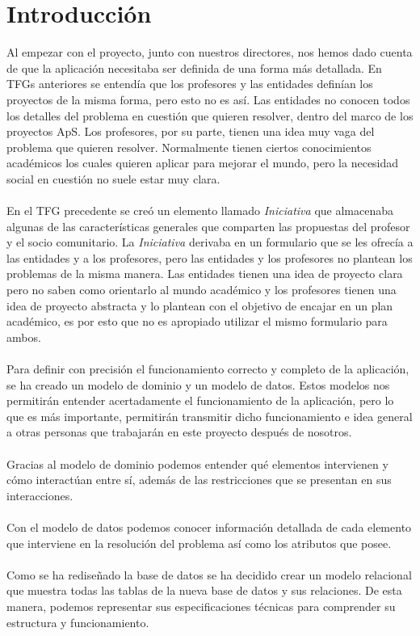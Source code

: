 \documentclass[11pt]{book}
\begin{document}
\section{Introducción}
Al empezar con el proyecto, junto con nuestros directores, nos hemos dado cuenta de que la aplicación necesitaba ser definida de una forma más detallada. En TFGs anteriores se entendía que los profesores y las entidades definían los proyectos de la misma forma, pero esto no es así. Las entidades no conocen todos los detalles del problema en cuestión que quieren resolver, dentro del marco de los proyectos ApS. Los profesores, por su parte, tienen una idea muy vaga del problema que quieren resolver. Normalmente tienen ciertos conocimientos académicos los cuales quieren aplicar para mejorar el mundo, pero la necesidad social en cuestión no suele estar muy clara.\\\\
En el TFG precedente se creó un elemento llamado \emph{Iniciativa} que almacenaba algunas de las características generales que comparten las propuestas del profesor y el socio comunitario. La \emph{Iniciativa} derivaba en un formulario que se les ofrecía a las entidades y a los profesores, pero las entidades y los profesores no plantean los problemas de la misma manera. Las entidades tienen una idea de proyecto clara pero no saben como orientarlo al mundo académico y los profesores tienen una idea de proyecto abstracta y lo plantean con el objetivo de encajar en un plan académico, es por esto que no es apropiado utilizar el mismo formulario para ambos.\\\\
Para definir con precisión el funcionamiento correcto y completo de la aplicación, se ha creado un modelo de dominio y un modelo de datos.
Estos modelos nos permitirán entender acertadamente el funcionamiento de la aplicación, pero lo que es más importante, permitirán transmitir dicho funcionamiento e idea general a otras personas que trabajarán en este proyecto después de nosotros.\\\\
Gracias al modelo de dominio podemos entender qué elementos intervienen y cómo interactúan entre sí, además de las restricciones que se presentan en sus interacciones.\\\\
Con el modelo de datos podemos conocer información detallada de cada elemento que interviene en la resolución del problema así como los atributos que posee.\\\\
Como se ha rediseñado la base de datos se ha decidido crear un modelo relacional que muestra todas las tablas de la nueva base de datos y sus relaciones. De esta manera, podemos representar sus especificaciones técnicas para comprender su estructura y funcionamiento. 
\end{document}
